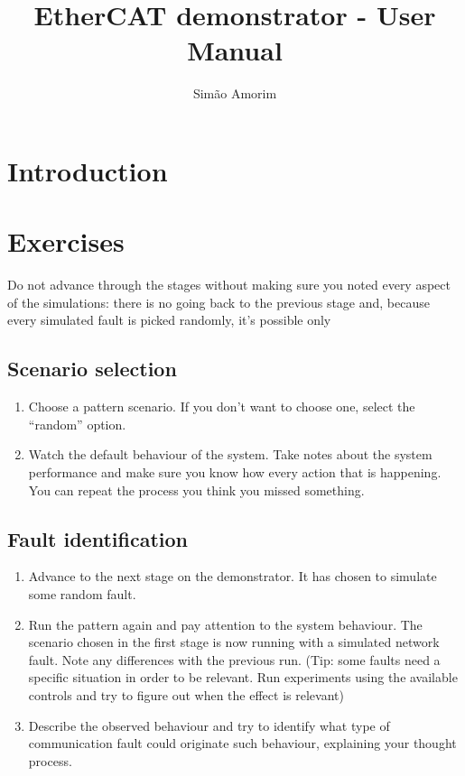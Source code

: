\documentclass[10pt,a4paper,draft]{article}
\title{EtherCAT demonstrator - User Manual}
\author{Simão Amorim}
\begin{document}
	\maketitle
	
	
	\section{Introduction}
	\blindtext
	
	\section{Exercises}
	Do not advance through the stages without making sure you noted every aspect of the simulations: there is
	no going back to the previous stage and, because every simulated fault is picked randomly, it's possible only

	\subsection{Scenario selection}
	\begin{enumerate}
		\item Choose a pattern scenario. If you don't want to choose one, select the \enquote{random} option.
		\item Watch the default behaviour of the system. Take notes about the system performance and make
		sure you know how every action that is happening. You can repeat the process you think you missed
		something.
	\end{enumerate}
	\subsection{Fault identification}
	\begin{enumerate}
		\item Advance to the next stage on the demonstrator. It has chosen to simulate some random fault.
		\item Run the pattern again and pay attention to the system behaviour. The scenario chosen in the first 
		stage is now running with a simulated network fault. Note any differences with the previous run. (Tip:
		some faults need a specific situation in order to be relevant. Run experiments using the available controls
		and try to figure out when the effect is relevant)
		\item Describe the observed behaviour and try to identify what type of communication fault could originate
		such behaviour, explaining your thought process.
	\end{enumerate}
\end{document}
